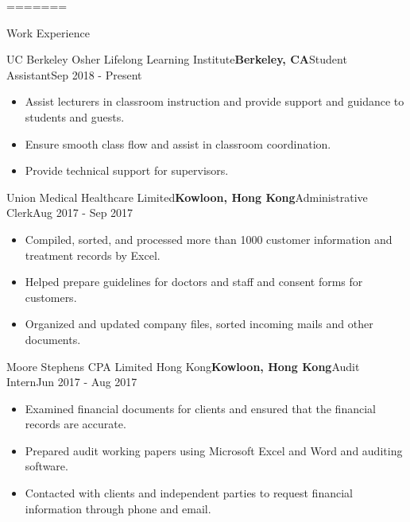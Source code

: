 \documentclass{resume}
\begin{document}


=======

\begin{rSection}{Work Experience}

\begin{rSubsection}{UC Berkeley Osher Lifelong Learning Institute}{\bf {Berkeley, CA}}{Student Assistant}{Sep 2018 - Present}
\begin{itemize}
    \item Assist lecturers in classroom instruction and provide support and guidance to students and guests.
    \item Ensure smooth class flow and assist in classroom coordination.
    \item Provide technical support for supervisors.
\end{itemize}
\end{rSubsection}

\begin{rSubsection}{Union Medical Healthcare Limited}{\bf {Kowloon, Hong Kong}}{Administrative Clerk}{Aug 2017 - Sep 2017}
\begin{itemize}
    \item Compiled, sorted, and processed more than 1000 customer information and treatment records by Excel.
    \item Helped prepare guidelines for doctors and staff and consent forms for customers.
    \item Organized and updated company files, sorted incoming mails and other documents.
\end{itemize}
\end{rSubsection}

\begin{rSubsection}{Moore Stephens CPA Limited Hong Kong}{\bf {Kowloon, Hong Kong}}{Audit Intern}{Jun 2017 - Aug 2017}
\begin{itemize}
    \item Examined financial documents for clients and ensured that the financial records are accurate.
    \item Prepared audit working papers using Microsoft Excel and Word and auditing software.
    \item Contacted with clients and independent parties to request financial information through phone and email.
\end{itemize}
\end{rSubsection}


\end{rSection}
\end{document}
\end{rSection}
\end{document}
